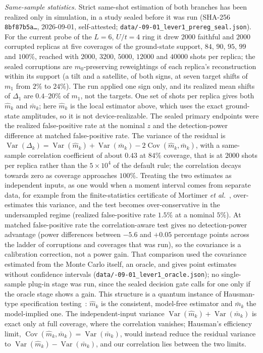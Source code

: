 \documentclass[submission, PhysCore]{SciPost}
\begin{document}
\begin{appendix}
\emph{Same-sample statistics.} Strict same-shot estimation of both branches has been realized only in simulation, in a study sealed before it was run (SHA-256 \texttt{8bf87b5a\ldots}, 2026-09-01, self-attested; \texttt{data/-09-01\_lever1\_prereg\_seal.json}). For the current probe of the $L=6$, $U/t=4$ ring it drew $2000$ faithful and $2000$ corrupted replicas at five coverages of the ground-state support, $84$, $90$, $95$, $99$ and $100\%$, reached with $2000$, $3200$, $5000$, $12000$ and $40000$ shots per replica; the sealed corruptions are $m_0$-preserving reweightings of each replica's reconstruction within its support (a tilt and a satellite, of both signs, at seven target shifts of $m_1$ from $2\%$ to $24\%$). The run applied one sign only, and its realized mean shifts of $\Delta_1$ are $0.4$--$20\%$ of $m_1$, not the targets. One set of shots per replica gives both $\widehat m_k$ and $\bar m_k$; here $\widehat m_k$ is the local estimator above, which uses the exact ground-state amplitudes, so it is not device-realizable. The sealed primary endpoints were the realized false-positive rate at the nominal $z$ and the detection-power difference at matched false-positive rate. The variance of the residual is $\operatorname{Var}(\Delta_k)=\operatorname{Var}(\widehat m_k)+\operatorname{Var}(\bar m_k)-2\operatorname{Cov}(\widehat m_k,\bar m_k)$, with a same-sample correlation coefficient of about $0.43$ at $84\%$ coverage, that is at $2000$ shots per replica rather than the $5\times10^4$ of the default rule; the correlation decays towards zero as coverage approaches $100\%$. Treating the two estimates as independent inputs, as one would when a moment interval comes from separate data, for example from the finite-statistics certificate of Mortimer \emph{et al.}~\cite{Mortimer2026}, over-estimates this variance, and the test becomes over-conservative in the undersampled regime (realized false-positive rate $1.5\%$ at a nominal $5\%$). At matched false-positive rate the correlation-aware test gives no detection-power advantage (power differences between $-5.6$ and $+0.05$ percentage points across the ladder of corruptions and coverages that was run), so the covariance is a calibration correction, not a power gain. That comparison used the covariance estimated from the Monte Carlo itself, an oracle, and gives point estimates without confidence intervals (\texttt{data/-09-01\_lever1\_oracle.json}); no single-sample plug-in stage was run, since the sealed decision gate calls for one only if the oracle stage shows a gain. This structure is a quantum instance of Hausman-type specification testing~\cite{Hausman1978}: $\widehat m_k$ is the consistent, model-free estimator and $\bar m_k$ the model-implied one. The independent-input variance $\operatorname{Var}(\widehat m_k)+\operatorname{Var}(\bar m_k)$ is exact only at full coverage, where the correlation vanishes; Hausman's efficiency limit, $\operatorname{Cov}(\widehat m_k,\bar m_k)=\operatorname{Var}(\bar m_k)$, would instead reduce the residual variance to $\operatorname{Var}(\widehat m_k)-\operatorname{Var}(\bar m_k)$, and our correlation lies between the two limits.


\end{appendix}
\end{document}
